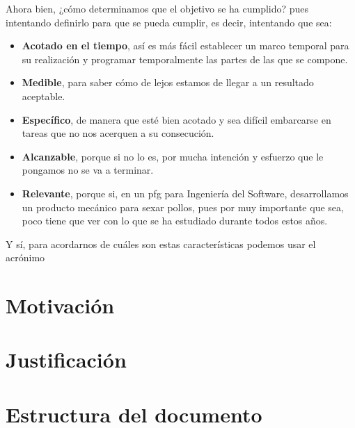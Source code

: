 Ahora bien, ¿cómo determinamos que el objetivo se ha cumplido? pues intentando definirlo para que se pueda cumplir, es decir, intentando que sea:

\begin{itemize}
    \item \textbf{Acotado en el tiempo}, así es más fácil establecer un marco temporal para su realización y programar temporalmente las partes de las que se compone.
    \item \textbf{Medible}, para saber cómo de lejos estamos de llegar a un resultado aceptable.
    \item \textbf{Específico}, de manera que esté bien acotado y sea difícil embarcarse en tareas que no nos acerquen a su consecución.
    \item \textbf{Alcanzable}, porque si no lo es, por mucha intención y esfuerzo que le pongamos no se va a terminar.
    \item \textbf{Relevante}, porque si, en un \gls{pfg} para Ingeniería del Software, desarrollamos un producto mecánico para sexar pollos, pues por muy importante que sea, poco tiene que ver con lo que se ha estudiado durante todos estos años.
\end{itemize}

Y sí, para acordarnos de cuáles son estas características podemos usar el acrónimo %
\section{Motivación}

\section{Justificación}
\section{Estructura del documento}

